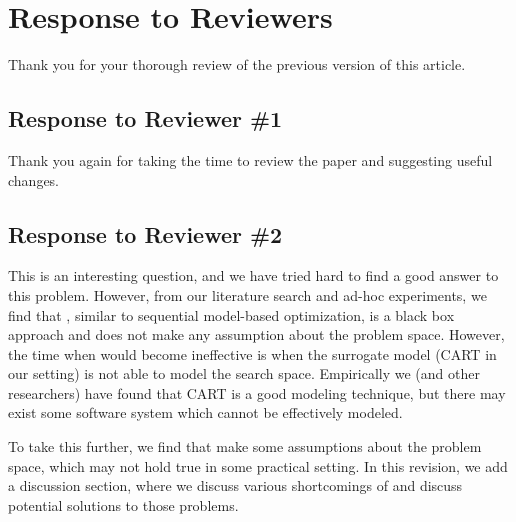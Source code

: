 \clearpage
\section*{Response to Reviewers}

Thank you for your thorough review of the previous version of this article.


\subsection*{Response to Reviewer \#1}


Thank you again for taking the time to review the paper and suggesting useful changes.



\subsection*{Response to Reviewer \#2}


This is an interesting question, and we have tried hard to find a good answer to this problem. However, from our literature search and ad-hoc experiments, we find that \flash, similar to sequential model-based optimization, is a black box approach and does not make any assumption about the problem space. However, the time when \flash would become ineffective is when the surrogate model (CART in our setting) is not able to model the search space. Empirically we (and other researchers) have found that CART is a good modeling technique, but there may exist some software system which cannot be effectively modeled. 

To take this further, we find that \flash make some assumptions about the problem space, which may not hold true in some practical setting. In this revision, we add a discussion section, where we discuss various shortcomings of \flash and discuss potential solutions to those problems. 